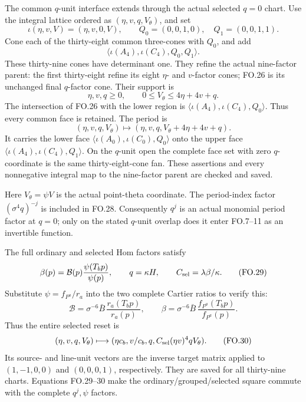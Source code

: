 The common \(q\)-unit interface extends through the
actual selected \(q=0\) chart. Use the integral
lattice ordered as \((\eta,v,q,V_\theta)\), and set
\[
 \iota(\eta,v,V)=(\eta,v,0,V),\qquad
 Q_0=(0,0,1,0),\quad Q_1=(0,0,1,1).                         \tag{FO.25}
\]
Cone each of the thirty-eight common three-cones
with \(Q_0\), and add
\[
 \langle\iota(A_4),\iota(C_4),Q_0,Q_1\rangle.                \tag{FO.26}
\]
These thirty-nine cones have determinant one.
They refine the actual nine-factor parent:
the first thirty-eight refine its eight
\(\eta\)- and \(v\)-factor cones; FO.26
is its unchanged final \(q\)-factor cone.
Their support is
\[
 \eta,v,q\ge0,\qquad0\le V_\theta\le4\eta+4v+q.              \tag{FO.27}
\]
The intersection of FO.26 with the lower region
is \(\langle\iota(A_4),\iota(C_4),Q_0\rangle\).
Thus every common face is retained. The period is
\[
 (\eta,v,q,V_\theta)\longmapsto
     (\eta,v,q,V_\theta+4\eta+4v+q).                        \tag{FO.28}
\]
It carries the lower face
\(\langle\iota(A_0),\iota(C_0),Q_0\rangle\)
onto the upper face
\(\langle\iota(A_4),\iota(C_4),Q_1\rangle\).
On the \(q\)-unit open the complete face set
with zero \(q\)-coordinate is the same
thirty-eight-cone fan. These assertions and
every nonnegative integral map to the
nine-factor parent are checked and saved.

Here \(V_\theta=\psi V\) is the actual
point-theta coordinate. The period-index
factor \((\sigma^4q)^{-j}\) is included
in FO.28. Consequently \(q^j\) is an actual
monomial period factor at \(q=0\); only on
the stated \(q\)-unit overlap does it enter
FO.7--11 as an invertible function.

The full ordinary and selected Hom factors satisfy
\[
 \beta(p)=\mathcal B(p)\frac{\psi(T_b p)}{\psi(p)},\qquad
 q=\kappa H,\qquad C_{\rm sel}=\lambda\beta/\kappa .
 \tag{FO.29}
\]
Substitute \(\psi=f_{P^a}/r_a\) into the
two complete Cartier ratios to verify this:
\[
 \mathcal B=\sigma^{-6}\bar B\,\frac{r_a(T_b p)}{r_a(p)},
 \qquad
 \beta=\sigma^{-6}\bar B\,
             \frac{f_{P^a}(T_b p)}{f_{P^a}(p)} .
\]
Thus the entire selected reset is
\[
 (\eta,v,q,V_\theta)\longmapsto
 (\eta c_b,v/c_b,q,C_{\rm sel}(\eta v)^4qV_\theta).
 \tag{FO.30}
\]
Its source- and line-unit vectors are the inverse
target matrix applied to \((1,-1,0,0)\) and
\((0,0,0,1)\), respectively. They are saved
for all thirty-nine charts. Equations
FO.29--30 make the ordinary/grouped/selected
square commute with the complete \(q^j,\psi\)
factors.

